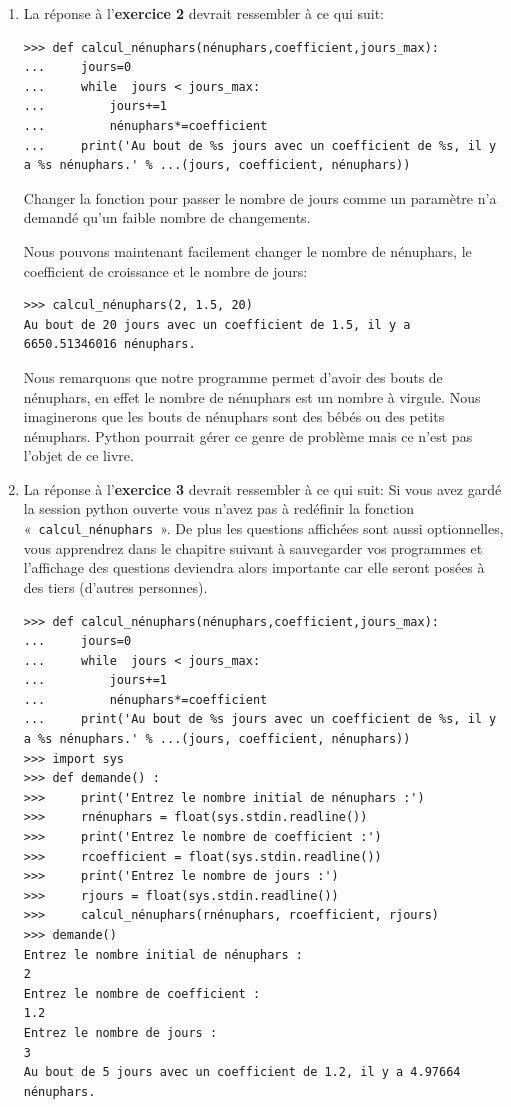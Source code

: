 \begin{enumerate}
\item La réponse à l'\textbf{exercice 2} devrait ressembler à ce qui suit: 
\begin{Verbatim}[frame=single,rulecolor=\color{mbleu}, label=à taper]
>>> def calcul_nénuphars(nénuphars,coefficient,jours_max):
...     jours=0
...     while  jours < jours_max:
...         jours+=1
...         nénuphars*=coefficient
...     print('Au bout de %s jours avec un coefficient de %s, il y a %s nénuphars.' % ...(jours, coefficient, nénuphars))
\end{Verbatim}
Changer la fonction pour passer le nombre de jours comme un paramètre n'a demandé qu'un faible nombre de changements.

Nous pouvons maintenant facilement changer le nombre de nénuphars, le coefficient de croissance et le nombre de jours:

\begin{Verbatim}[frame=single,rulecolor=\color{mbleu}, label=à taper]
>>> calcul_nénuphars(2, 1.5, 20)
Au bout de 20 jours avec un coefficient de 1.5, il y a 6650.51346016 nénuphars.
\end{Verbatim}
Nous remarquons que notre programme permet d'avoir des bouts de nénuphars, en effet le nombre de nénuphars est un nombre à virgule. Nous imaginerons que les bouts de nénuphars sont des bébés ou des petits nénuphars. Python pourrait gérer ce genre de problème mais ce n'est pas l'objet de ce livre.

\item La réponse à l'\textbf{exercice 3} devrait ressembler à ce qui suit: 
Si vous avez gardé la session python ouverte vous n'avez pas à redéfinir la fonction «~\texttt{calcul\_nénuphars}~». De plus les questions affichées sont aussi optionnelles, vous apprendrez dans le chapitre suivant à sauvegarder vos programmes et l'affichage des questions deviendra alors importante car elle seront posées à des tiers (d'autres personnes).

\begin{Verbatim}[frame=single,rulecolor=\color{mbleu}, label=à taper]
>>> def calcul_nénuphars(nénuphars,coefficient,jours_max):
...     jours=0
...     while  jours < jours_max:
...         jours+=1
...         nénuphars*=coefficient
...     print('Au bout de %s jours avec un coefficient de %s, il y a %s nénuphars.' % ...(jours, coefficient, nénuphars))
>>> import sys
>>> def demande() : 
>>>     print('Entrez le nombre initial de nénuphars :')
>>>     rnénuphars = float(sys.stdin.readline())
>>>     print('Entrez le nombre de coefficient :')
>>>     rcoefficient = float(sys.stdin.readline())
>>>     print('Entrez le nombre de jours :')
>>>     rjours = float(sys.stdin.readline())
>>>     calcul_nénuphars(rnénuphars, rcoefficient, rjours)
>>> demande()
Entrez le nombre initial de nénuphars :
2
Entrez le nombre de coefficient :
1.2
Entrez le nombre de jours :
3
Au bout de 5 jours avec un coefficient de 1.2, il y a 4.97664 nénuphars.\end{Verbatim}
\end{enumerate}

